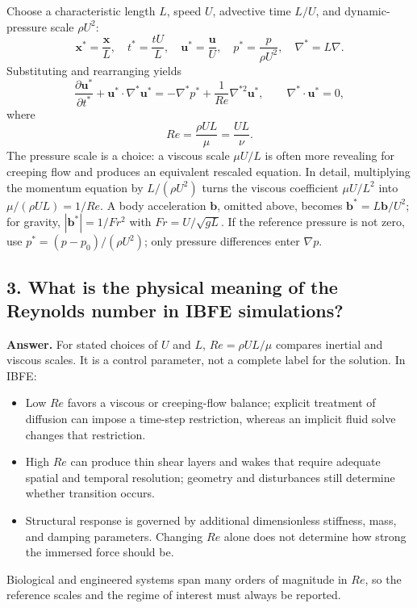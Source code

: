 \documentclass[12pt]{article}
\begin{document}
Choose a characteristic length $L$, speed $U$, advective time $L/U$, and
dynamic-pressure scale $\rho U^2$:
\[
\mathbf{x}^*=\frac{\mathbf{x}}{L},\quad t^*=\frac{tU}{L},\quad \mathbf{u}^*=\frac{\mathbf{u}}{U},
\quad p^*=\frac{p}{\rho U^2},\quad \nabla^*=L\nabla.
\]
Substituting and rearranging yields
\[
\frac{\partial \mathbf{u}^*}{\partial t^*}
+ \mathbf{u}^*\cdot\nabla^*\mathbf{u}^*
= -\nabla^* p^* + \frac{1}{Re}\nabla^{*2}\mathbf{u}^*,
\qquad \nabla^*\cdot\mathbf{u}^*=0,
\]
where
\[
Re = \frac{\rho UL}{\mu}=\frac{UL}{\nu}.
\]
The pressure scale is a choice: a viscous scale $\mu U/L$ is often more
revealing for creeping flow and produces an equivalent rescaled equation.
In detail, multiplying the momentum equation by $L/(\rho U^2)$ turns the
viscous coefficient $\mu U/L^2$ into $\mu/(\rho UL)=1/Re$. A body acceleration
$\mathbf{b}$, omitted above, becomes $\mathbf{b}^*=L\mathbf{b}/U^2$; for gravity,
$|\mathbf{b}^*|=1/Fr^2$ with $Fr=U/\sqrt{gL}$. If the reference pressure is not
zero, use $p^*=(p-p_0)/(\rho U^2)$; only pressure differences enter $\nabla p$.


\subsection*{3. What is the physical meaning of the Reynolds number in IBFE simulations?}

\textbf{Answer.}
For stated choices of $U$ and $L$, $Re=\rho UL/\mu$ compares inertial and
viscous scales. It is a control parameter, not a complete label for the
solution. In IBFE:
\begin{itemize}
    \item Low $Re$ favors a viscous or creeping-flow balance; explicit treatment
          of diffusion can impose a time-step restriction, whereas an implicit
          fluid solve changes that restriction.
    \item High $Re$ can produce thin shear layers and wakes that require adequate
          spatial and temporal resolution; geometry and disturbances still
          determine whether transition occurs.
    \item Structural response is governed by additional dimensionless stiffness,
          mass, and damping parameters. Changing $Re$ alone does not determine
          how strong the immersed force should be.
\end{itemize}
Biological and engineered systems span many orders of magnitude in $Re$, so the
reference scales and the regime of interest must always be reported.
\end{document}
